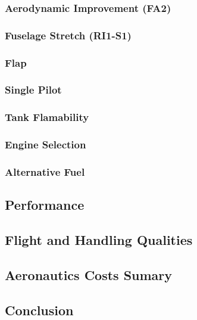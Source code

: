 	\subsubsection{Aerodynamic Improvement (FA2)}
		
	\subsubsection{Fuselage Stretch (RI1-S1)}
		
	\subsubsection{Flap}
		
	\subsubsection{Single Pilot}
		
	\subsubsection{Tank Flamability}
		
	\subsubsection{Engine Selection}
        
    \subsubsection{Alternative Fuel}	
        

\subsection{Performance}
         
		
\subsection{Flight and Handling Qualities}
	

\subsection{Aeronautics Costs Sumary}
	

\subsection{Conclusion}
	

